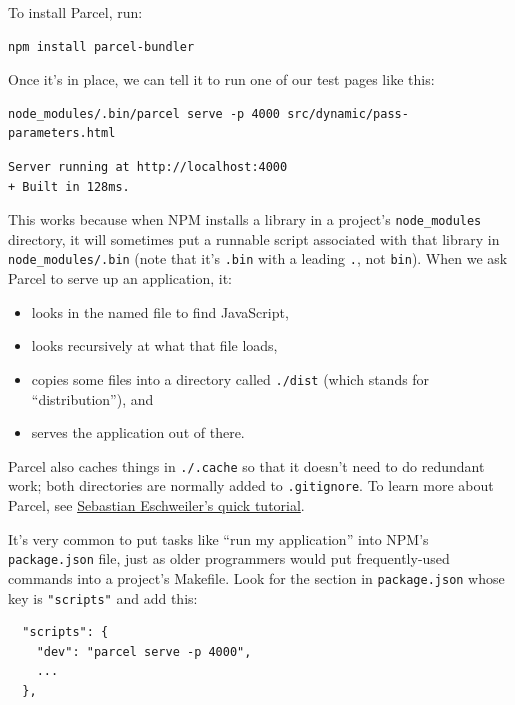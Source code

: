 To install Parcel, run:

\begin{verbatim}
npm install parcel-bundler
\end{verbatim}

Once it's in place, we can tell it to run one of our test pages like
this:

\begin{verbatim}
node_modules/.bin/parcel serve -p 4000 src/dynamic/pass-parameters.html
\end{verbatim}

\begin{verbatim}
Server running at http://localhost:4000
+ Built in 128ms.
\end{verbatim}

This works because when NPM installs a library in a project's
\texttt{node\_modules} directory, it will sometimes put a runnable
script associated with that library in \texttt{node\_modules/.bin} (note
that it's \texttt{.bin} with a leading \texttt{.}, not \texttt{bin}).
When we ask Parcel to serve up an application, it:

\begin{itemize}
\tightlist
\item
  looks in the named file to find JavaScript,
\item
  looks recursively at what that file loads,
\item
  copies some files into a directory called \texttt{./dist} (which
  stands for ``distribution''), and
\item
  serves the application out of there.
\end{itemize}

Parcel also caches things in \texttt{./.cache} so that it doesn't need
to do redundant work; both directories are normally added to
\texttt{.gitignore}. To learn more about Parcel, see
\href{https://medium.com/codingthesmartway-com-blog/getting-started-with-parcel-197eb85a2c8c}{Sebastian
Eschweiler's quick tutorial}.

It's very common to put tasks like ``run my application'' into NPM's
\texttt{package.json} file, just as older programmers would put
frequently-used commands into a project's Makefile. Look for the section
in \texttt{package.json} whose key is \texttt{"scripts"} and add this:

\begin{verbatim}
  "scripts": {
    "dev": "parcel serve -p 4000",
    ...
  },
\end{verbatim}

